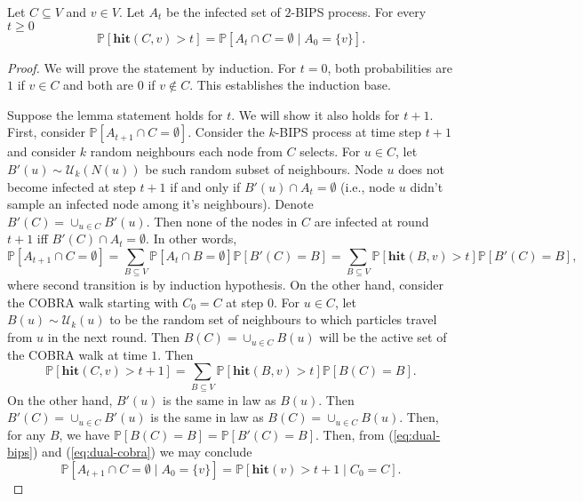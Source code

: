 \documentclass[11pt]{article}
\newcommand{\hit}{\mathbf{hit}}
\renewcommand{\Pr}{\mathbb P}
\theoremstyle{remark}
\begin{document}
\begin{lemma}
\label{lemma:dual}
    Let $C \subseteq V$ and $v \in V$. Let $A_t$ be the infected set of $2$-BIPS process. For every $t \ge 0$
    \[\Pr\left[\hit(C,v) > t \right] = \Pr\left[A_t \cap C = \emptyset \mid A_0 = \{v\} \right]. \]
\end{lemma}
\begin{proof}
    We will prove the statement by induction. For $t = 0$, both probabilities are $1$ if $v \in C$ and both are $0$ if $v \not \in C$. This establishes the induction base. 

    Suppose the lemma statement holds for $t$. We will show it also holds for $t + 1$. First, consider $\Pr\left[A_{t+1} \cap C = \emptyset\right]$. Consider the $k$-BIPS process at time step $t + 1$ and consider $k$ random neighbours each node from $C$ selects. For $u \in C$, let $B'(u) \sim \mathcal U_k(N(u))$ be such random subset of neighbours. Node $u$ does not become infected at step $t+1$ if and only if $B'(u) \cap A_t = \emptyset$ (i.e., node $u$ didn't sample an infected node among it's neighbours). Denote $B'(C) = \cup_{u \in C} B'(u)$.
    Then none of the nodes in $C$ are infected at round $t+1$ iff $B'(C) \cap A_t = \emptyset$. In other words,
    \begin{equation}
    \label{eq:dual-bips}
    \Pr\left[A_{t+1} \cap C = \emptyset\right] =  \sum_{B \subseteq V} \Pr\left[A_{t} \cap B = \emptyset\right] \Pr[B'(C) = B]= \sum_{B\subseteq V} \Pr[\hit(B,v) > t] \Pr[B'(C) = B],
    \end{equation}
    where second transition is by induction hypothesis.
    On the other hand, consider the COBRA walk starting with $C_0 = C$ at step $0$. For $u\in C$, let $B(u) \sim \mathcal U_k(u)$ to be the random set of neighbours to which particles travel from $u$ in the next round. Then $B(C) = \cup_{u \in C} B(u)$ will be the active set of the COBRA walk at time $1$. Then
    \begin{equation}
    \label{eq:dual-cobra}
    \Pr\left[\hit(C, v) > t + 1\right] = \sum_{B \subseteq V}  \Pr\left[\hit(B,v) > t\right] \Pr[B(C) = B].
    \end{equation}
    On the other hand, $B'(u)$ is the same in law as $B(u)$. Then $B'(C) = \cup_{u \in C} B'(u)$ is the same in law as $B(C) = \cup_{u \in C} B(u)$. Then, for any $B$, we have $\Pr[B(C) = B] = \Pr[B'(C) = B]$. Then, from (\ref{eq:dual-bips}) and (\ref{eq:dual-cobra}) we may conclude 
    \[\Pr\left[A_{t+1} \cap C = \emptyset \mid A_0 = \{v\} \right] = \Pr\left[\hit(v) > t+1 \mid C_0 = C \right].\]
\end{proof}
\end{document}
